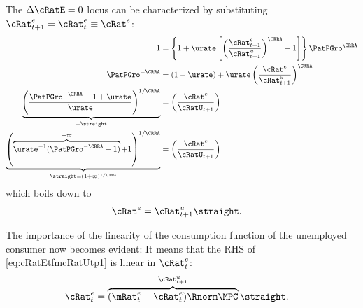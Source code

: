 \documentclass{\handout}
\begin{document}
The $\dcEqZero$ locus can be characterized by substituting ${\cRat}^{e}_{t+1}={\cRat}^{e}_{t} \equiv {\cRat}^{e}$:
\begin{equation}\begin{gathered}\begin{aligned}
         1 & = \left\{1+\urate\left[\left(\frac{{\cRat}^{e}_{t+1}}{\cRat_{t+1}^{u}}\right)^{\CRRA}-1\right]\right\} \PatPGro^{\CRRA}  \notag
\\ \PatPGro^{-\CRRA} & =  (1-\urate)+\urate\left(\frac{{\cRat}^{e}_{\tSS}}{\cRat_{t+1}^{u} }\right)^{\CRRA} \notag
\\ \underbrace{\left(\frac{\PatPGro^{-\CRRA}-1+\urate}{\urate}\right)^{1/\CRRA}}_{\equiv \straight} & =   \left(\frac{{\cRat}^{e}_{\tSS}}{\cRatU_{t+1}}\right) \label{eq:straightDef}
  \\ \underbrace{\left(\overbrace{\urate^{-1}(\PatPGro^{-\CRRA}-1)}^{\equiv \varpi}+1\right)^{1/\CRRA}}_{\straight=(1+\varpi)^{1/\CRRA}} & =   \left(\frac{{\cRat}^{e}_{\tSS}}{\cRatU_{t+1}}\right) \notag %
\end{aligned}\end{gathered}\end{equation}
which boils down to 
\begin{equation}\begin{gathered}\begin{aligned}
     {\cRat}^{e}_{\tSS} & = \cRat^{u}_{t+1} \straight \label{eq:cRatEtfmcRatUtp1}.
\end{aligned}\end{gathered}\end{equation}


The importance of the linearity of the consumption function of the unemployed consumer now becomes evident:  It means that the RHS of \eqref{eq:cRatEtfmcRatUtp1} is linear in $\cRat^{e}_{t}$:
\begin{equation}\begin{gathered}\begin{aligned}
  \cRat^{e}_{t} & =  \overbrace{(\mRat^{e}_{t}-{\cRat}^{e}_{t})\Rnorm \MPCU}^{\cRat^{u}_{t+1}} \straight \label{eq:PSTerm}.
\end{aligned}\end{gathered}\end{equation}
\end{document}
